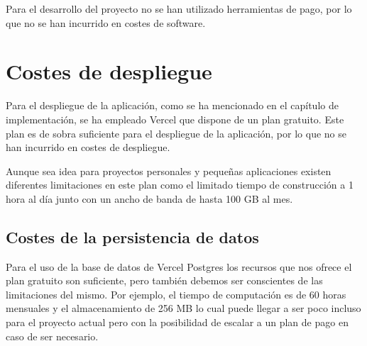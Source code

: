 Para el desarrollo del proyecto no se han utilizado herramientas de pago, por lo que no se han incurrido en costes de software.

\section{Costes de despliegue}

Para el despliegue de la aplicación, como se ha mencionado en el capítulo de implementación, se ha empleado Vercel que dispone de un plan gratuito. Este plan es de sobra suficiente para el despliegue de la aplicación, por lo que no se han incurrido en costes de despliegue.

Aunque sea idea para proyectos personales y pequeñas aplicaciones existen diferentes limitaciones en este plan como el limitado tiempo de construcción a 1 hora al día junto con un ancho de banda de hasta 100 GB al mes.

\subsection{Costes de la persistencia de datos}

Para el uso de la base de datos de Vercel Postgres los recursos que nos ofrece el plan gratuito son suficiente, pero también debemos ser conscientes de las limitaciones del mismo. Por ejemplo, el tiempo de computación es de 60 horas mensuales y el almacenamiento de 256 MB lo cual puede llegar a ser poco incluso para el proyecto actual pero con la posibilidad de escalar a un plan de pago en caso de ser necesario.